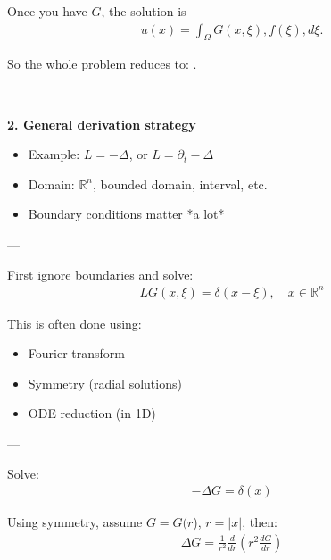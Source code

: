 \documentclass[12pt,a4paper]{report}
\begin{document}
\begin{description}
\begin{description}
Once you have $G$, the solution is
\begin{align*}
u(x) = \int_\Omega G(x,\xi), f(\xi), d\xi.
\end{align*}

So the whole problem reduces to:
.

---

\item \textbf{2. General derivation strategy}

\begin{description}
\item {}

\begin{itemize}
\item Example: $L = -\Delta$, or $L = \partial_t - \Delta$
\item Domain: $\mathbb{R}^n$, bounded domain, interval, etc.
\item Boundary conditions matter *a lot*
\end{itemize}

---

\item {}

First ignore boundaries and solve:
\begin{align*}
L G(x,\xi) = \delta(x-\xi), \quad x \in \mathbb{R}^n
\end{align*}

This is often done using:

\begin{itemize}
\item Fourier transform
\item Symmetry (radial solutions)
\item ODE reduction (in 1D)
\end{itemize}

---

\item {}

Solve:
\begin{align*}
-\Delta G = \delta(x)
\end{align*}

Using symmetry, assume $G = G(r$), $r = |x|$, then:
\begin{align*}
\Delta G = \frac{1}{r^2}\frac{d}{dr}\left(r^2 \frac{dG}{dr}\right)
\end{align*}


\end{description}
\end{description}
\end{description}
\end{document}

